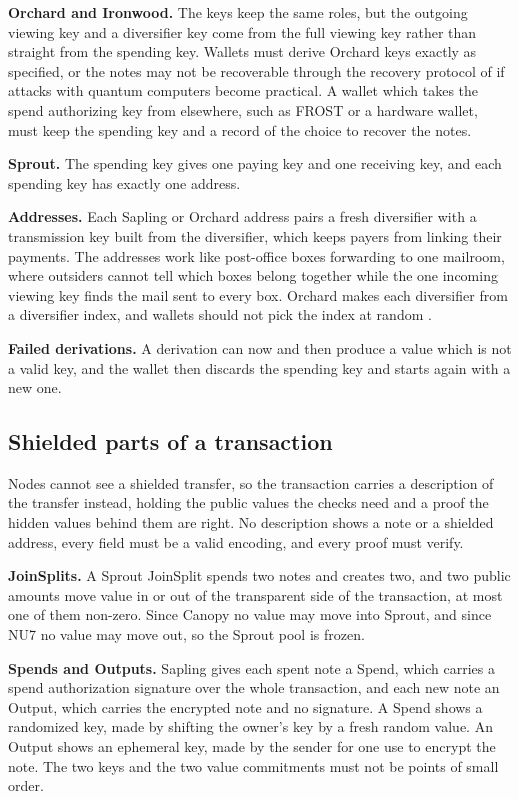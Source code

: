 \documentclass{article}
\let\oldcite\cite
\renewcommand{\cite}[2][]{\raisebox{0ex}{\oldcite[{#1}]{#2}}}
\newcommand{\lsubsection}[2]{\def\sectionlabel{#2} \subsection{#1}\label{#2}}
\theoremstyle{labelledtheorem} %
\begin{document}
\textbf{Orchard and Ironwood.} The keys keep the same roles, but the outgoing viewing key and a diversifier key come from the full viewing key rather than straight from the spending key. Wallets must derive Orchard keys exactly as specified, or the notes may not be recoverable through the recovery protocol of \cite{ZIP-2005} if attacks with quantum computers become practical. A wallet which takes the spend authorizing key from elsewhere, such as FROST or a hardware wallet, must keep the spending key and a record of the choice to recover the notes.

\textbf{Sprout.} The spending key gives one paying key and one receiving key, and each spending key has exactly one address.

\textbf{Addresses.} Each Sapling or Orchard address pairs a fresh diversifier with a transmission key built from the diversifier, which keeps payers from linking their payments. The addresses work like post-office boxes forwarding to one mailroom, where outsiders cannot tell which boxes belong together while the one incoming viewing key finds the mail sent to every box. Orchard makes each diversifier from a diversifier index, and wallets should not pick the index at random \cite{ZIP-32}.

\textbf{Failed derivations.} A derivation can now and then produce a value which is not a valid key, and the wallet then discards the spending key and starts again with a new one.

\lsubsection{Shielded parts of a transaction}{readabledescriptions}
\label{joinsplitdesc}\label{outputdesc}\label{spenddesc}%

Nodes cannot see a shielded transfer, so the transaction carries a description of the transfer instead, holding the public values the checks need and a proof the hidden values behind them are right. No description shows a note or a shielded address, every field must be a valid encoding, and every proof must verify.

\textbf{JoinSplits.} A Sprout JoinSplit spends two notes and creates two, and two public amounts move value in or out of the transparent side of the transaction, at most one of them non-zero. Since Canopy no value may move into Sprout, and since NU7 no value may move out, so the Sprout pool is frozen.

\textbf{Spends and Outputs.} Sapling gives each spent note a Spend, which carries a spend authorization signature over the whole transaction, and each new note an Output, which carries the encrypted note and no signature. A Spend shows a randomized key, made by shifting the owner's key by a fresh random value. An Output shows an ephemeral key, made by the sender for one use to encrypt the note. The two keys and the two value commitments must not be points of small order.
\end{document}
